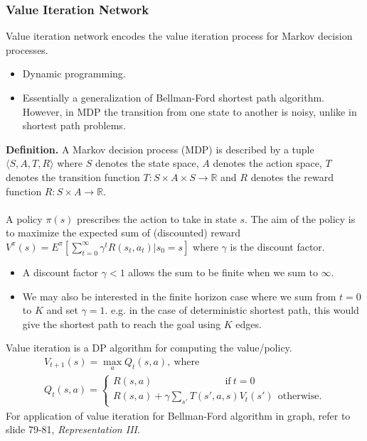 \documentclass{article}
\begin{document}
   \subsubsection{Value Iteration Network}
   Value iteration network encodes the value iteration process for Markov decision processes.
   \begin{itemize}
   \item Dynamic programming.
   \item Essentially a generalization of Bellman-Ford shortest path algorithm. However, in MDP the transition from one state to another is noisy, unlike in shortest path problems.
   \end{itemize}
   \textbf{Definition.} A Markov decision process (MDP) is described by a tuple $\langle S, A, T, R \rangle$ where $S$ denotes the state space, $A$ denotes the action space, $T$ denotes the transition function $T:S\times A \times S \rightarrow \mathbb{R}$ and $R$ denotes the reward function $R:S\times A \rightarrow \mathbb{R}$. 
   \\\\
   A policy $\pi(s)$ prescribes the action to take in state $s$. The aim of the policy is to maximize the expected sum of (discounted) reward $V^\pi(s) = E^\pi[\sum_{t=0}^\infty \gamma^t R(s_t, a_t)|s_0=s]$ where $\gamma$ is the discount factor.
   \begin{itemize}
   \item A discount factor $\gamma < 1$ allows the sum to be finite when we sum to $\infty$.
   \item We may also be interested in the finite horizon case where we sum from $t=0$ to $K$ and set $\gamma = 1$. e.g. in the case of deterministic shortest path, this would give the shortest path to reach the goal using $K$ edges.
   \end{itemize}
   Value iteration is a DP algorithm for computing the value/policy.
   \begin{gather}
   V_{t+1}(s) = \max_a Q_t(s,a), \ \text{where} \\
   Q_t(s,a) = 
   \begin{cases}
   R(s,a) \ \ \ \ \ \ \ \ \ \ \ \ \ \ \ \ \ \ \ \ \ \ \ \ \ \ \ \ \ \ \ \ \ \text{if}\ t = 0 \\
   R(s,a) + \gamma \sum_{s'} T(s',a,s)V_t(s') \ \ \text{otherwise}.
   \end{cases}
   \end{gather}
   For application of value iteration for Bellman-Ford algorithm in graph, refer to slide 79-81, \textit{Representation III}.
   
\end{document}
